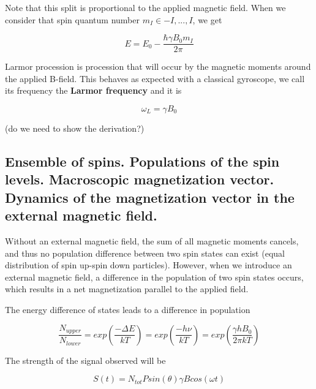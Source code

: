 \documentclass[12pt]{article}
\begin{document}
Note that this split is proportional to the applied magnetic field. When we consider that spin quantum number $m_I \in {-I, ..., I}$, we get

\[E = E_0 - \frac{\hbar \gamma B_0 m_I}{2\pi}\]






Larmor procession is procession that will occur by the magnetic moments around the applied B-field. This behaves as expected with a classical gyroscope, we call its frequency the \textbf{Larmor frequency} and it is

\[ \omega_L = \gamma B_0\]

(do we need to show the derivation?)

\subsection{ Ensemble of spins. Populations of the spin levels. Macroscopic magnetization vector. Dynamics of the magnetization vector in the external magnetic field.}

Without an external magnetic field, the sum of all magnetic moments cancels, and thus no population difference between two spin states can exist (equal distribution of spin up-spin down particles). However, when we introduce an external magnetic field, a difference in the population of two spin states occurs, which results in a net magnetization parallel to the applied field.

The energy difference of states leads to a difference in population

\[\frac{N_{upper}}{N_{lower}} = exp({\frac{-\Delta E}{kT}}) = exp({\frac{-h \nu}{kT}}) = exp({\frac{\gamma h B_0}{2\pi kT}})\]



The strength of the signal observed will be

\[S(t) = N_{tot}Psin(\theta)\gamma B cos(\omega t)\]
\end{document}
